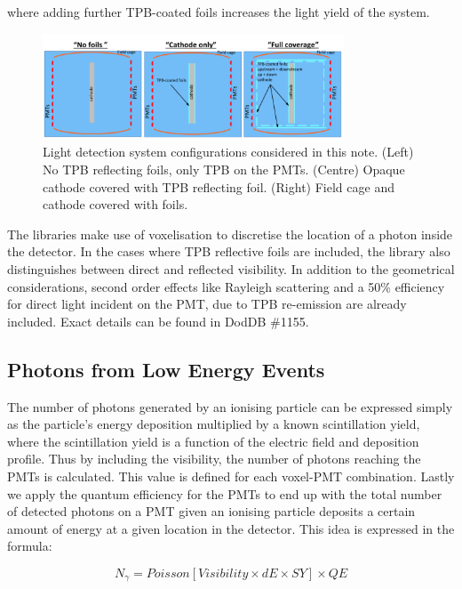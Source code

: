 \documentclass[a4paper]{article}
\begin{document}
\noindent where adding further TPB-coated foils increases the light yield of the system.

\begin{figure}[H]
\center
\includegraphics[width=0.8\textwidth]{configurations.png}
\caption{Light detection system configurations considered in this note. (Left) No TPB reflecting foils, only TPB on the PMTs. (Centre) Opaque cathode covered with TPB reflecting foil. (Right) Field cage and cathode covered with foils.}\label{light_configurations}
\end{figure}

The libraries make use of voxelisation to discretise the location of a photon inside the detector. In the cases where TPB reflective foils are included, the library also distinguishes between direct and reflected visibility. In addition to the geometrical considerations, second order effects like Rayleigh scattering and a 50\% efficiency for direct light incident on the PMT, due to TPB re-emission are already included. Exact details can be found in DodDB \#1155.

\subsection{Photons from Low Energy Events}

The number of photons generated by an ionising particle can be expressed simply as the particle's energy deposition multiplied by a known scintillation yield, where the scintillation yield is a function of the electric field and deposition profile. Thus by including the visibility, the number of photons reaching the PMTs is calculated. This value is defined for each voxel-PMT combination. Lastly we apply the quantum efficiency for the PMTs to end up with the total number of detected photons on a PMT given an ionising particle deposits a certain amount of energy at a given location in the detector. This idea is expressed in the formula:

\begin{equation} \label{no_gamma}
N_{\gamma} = Poisson[Visibility \times dE \times SY] \times QE
\end{equation}
\end{document}
